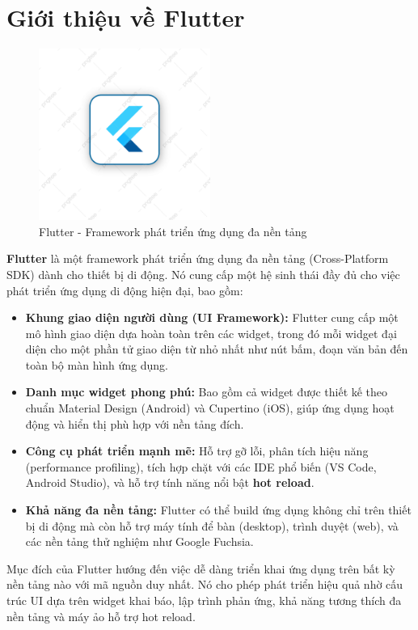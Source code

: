 \documentclass[../DoAn.tex]{subfiles}
\numberwithin{figure}{chapter}
\begin{document}
\section{Giới thiệu về Flutter}
\begin{figure}[H]
    \centering
    \includegraphics[width=0.5\textwidth]{Hinhve/flutterimg.png}
    \caption{Flutter - Framework phát triển ứng dụng đa nền tảng}
    \label{fig:flutterimg}
\end{figure}

\textbf{Flutter} là một framework phát triển ứng dụng đa nền
tảng (Cross-Platform SDK) dành cho thiết bị di động. Nó cung cấp một hệ sinh thái đầy đủ cho việc phát triển ứng dụng di động hiện đại, bao gồm:
\begin{itemize}
    \item \textbf{Khung giao diện người dùng (UI Framework):} Flutter cung cấp một mô hình giao diện dựa hoàn toàn trên các widget, trong đó mỗi widget đại diện cho một phần tử giao diện từ nhỏ nhất như nút bấm, đoạn văn bản đến toàn bộ màn hình ứng dụng.
    \item \textbf{Danh mục widget phong phú:} Bao gồm cả widget được thiết kế theo chuẩn Material Design (Android) và Cupertino (iOS), giúp ứng dụng hoạt động và hiển thị phù hợp với nền tảng đích.
    \item \textbf{Công cụ phát triển mạnh mẽ:} Hỗ trợ gỡ lỗi, phân tích hiệu năng (performance profiling), tích hợp chặt với các IDE phổ biến (VS Code, Android Studio), và hỗ trợ tính năng nổi bật \textbf{hot reload}.
    \item \textbf{Khả năng đa nền tảng:} Flutter có thể build ứng dụng không chỉ trên thiết bị di động mà còn hỗ trợ máy tính để bàn (desktop), trình duyệt (web), và các nền tảng thử nghiệm như Google Fuchsia.
\end{itemize}

Mục đích của Flutter hướng đến việc dễ dàng triển khai ứng dụng trên bất kỳ nền tảng nào với mã nguồn duy nhất. Nó cho phép phát triển hiệu quả nhờ cấu trúc UI dựa trên widget khai báo, lập trình phản ứng, khả năng tương thích đa nền tảng và máy ảo hỗ trợ hot reload. 
\end{document}
